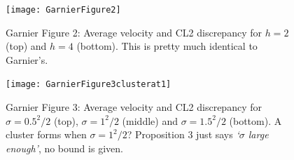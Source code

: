 \documentclass[11pt,a4paper, final, dvipsnames]{article}
\begin{document}
    \begin{figure}
        \centering
        \texttt{[image: GarnierFigure2]}
        \caption{Garnier Figure 2: Average velocity and CL2 discrepancy for $ h=2$ (top) and $h=4$ (bottom). This is pretty much identical to Garnier's.}
    \end{figure}

    \begin{figure}
        \centering
        \texttt{[image: GarnierFigure3clusterat1]}
        \caption{Garnier Figure 3: Average velocity and CL2 discrepancy for $\sigma = 0.5^2/2$ (top), $\sigma = 1^2/2$ (middle) and $\sigma = 1.5^2/2$ (bottom). A cluster forms when $\sigma=1^2/2$? Proposition 3 just says \emph{`$\sigma$ large enough'}, no bound is given.}
    \end{figure}
\end{document}
